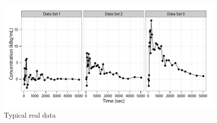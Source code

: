 \begin{figure}[t]
  \linespread{1.1}\selectfont
  \includegraphics[width=\linewidth]{fig_src/Typical_PET}
  \caption{Typical real \protect\pet data}
  \label{fig:typical real pet}
\end{figure}
